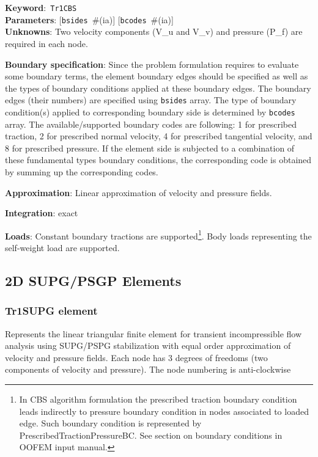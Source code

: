 \documentclass[a4paper]{article}
\newcommand{\descitem}[1]{{\noindent \textbf{#1}}:}
\newcommand{\elemkeyword}[1]{\descitem{Keyword}~\param{#1}} %
\newcommand{\param}[1]{\texttt{#1}} %
\newcommand{\optional}[1]{[#1]} %
\newcommand{\field}[2]{\param{#1}~\#{\tiny(#2)}} %
\newcommand{\optField}[2]{\optional{\field{#1}{#2}}}
\begin{document}
\elemkeyword{Tr1CBS}\\
\descitem{Parameters} \optField{bsides}{ia} \optField{bcodes}{ia}\\
\descitem{Unknowns}
Two velocity components (V\_u and V\_v) and pressure (P\_f) are required in each node.

\descitem{Boundary specification}
Since the problem formulation requires to evaluate some boundary terms,
the element boundary edges should be specified as well as the types of
boundary conditions applied at these boundary edges. The boundary
edges (their numbers) are specified using \param{bsides} array. The
type of boundary condition(s) applied to corresponding boundary side
is determined by \param{bcodes} array. The available/supported
boundary codes are following: 1 for prescribed traction, 2 for
prescribed normal velocity, 4 for prescribed tangential velocity, and
8 for prescribed pressure. If the element side is subjected to a
combination of these fundamental types boundary conditions, the
corresponding code is obtained by summing up the corresponding codes.

\descitem{Approximation} Linear approximation of velocity and pressure
fields.

\descitem{Integration}
exact

\descitem{Loads} Constant boundary tractions are supported\footnote{In CBS algorithm formulation the prescribed traction
boundary condition leads indirectly to pressure boundary condition in
nodes associated to loaded edge. Such boundary condition is
represented by PrescribedTractionPressureBC. See section on boundary
conditions in OOFEM input manual.}. Body loads
representing the self-weight load are supported.

\clearpage
\subsection{2D SUPG/PSGP Elements}
\subsubsection{Tr1SUPG element}
\label{Tr1SUPG}
Represents the linear triangular finite element for transient
incompressible flow analysis using SUPG/PSPG stabilization with equal order
approximation of velocity and pressure fields. Each node has 3 degrees
of freedoms (two components of velocity and pressure).
The node numbering is anti-clockwise
\end{document}
